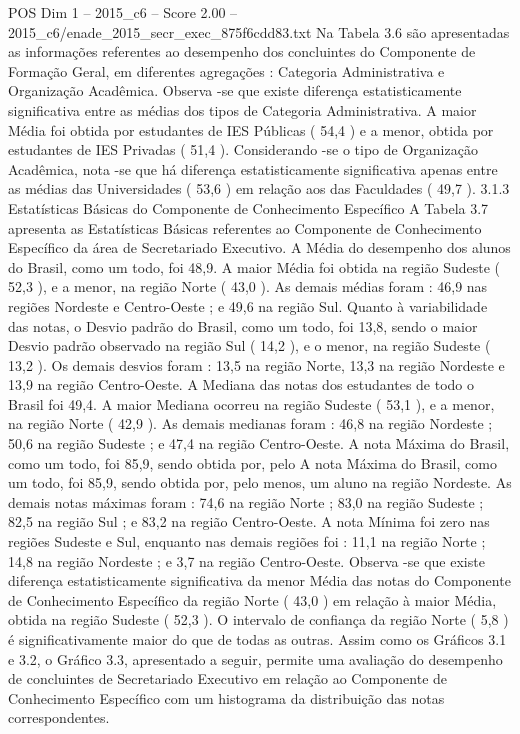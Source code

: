 \begin{textsample}{POS Dim 1 – 2015\_c6 – Score 2.00 – 2015\_c6/enade\_2015\_secr\_exec\_875f6cdd83.txt}
Na Tabela 3.6 são apresentadas as informações referentes ao desempenho dos concluintes do Componente de Formação Geral, em diferentes agregações : Categoria Administrativa e Organização Acadêmica.
Observa -se que existe diferença estatisticamente significativa entre as médias dos tipos de Categoria Administrativa.
A maior Média foi obtida por estudantes de IES Públicas ( 54,4 ) e a menor, obtida por estudantes de IES Privadas ( 51,4 ).
Considerando -se o tipo de Organização Acadêmica, nota -se que há diferença estatisticamente significativa apenas entre as médias das Universidades ( 53,6 ) em relação aos das Faculdades ( 49,7 ). 3.1.3 Estatísticas Básicas do Componente de Conhecimento Específico A Tabela 3.7 apresenta as Estatísticas Básicas referentes ao Componente de Conhecimento Específico da área de Secretariado Executivo.
A Média do desempenho dos alunos do Brasil, como um todo, foi 48,9.
A maior Média foi obtida na região Sudeste ( 52,3 ), e a menor, na região Norte ( 43,0 ).
As demais médias foram : 46,9 nas regiões Nordeste e Centro-Oeste ; e 49,6 na região Sul.
Quanto à variabilidade das notas, o Desvio padrão do Brasil, como um todo, foi 13,8, sendo o maior Desvio padrão observado na região Sul ( 14,2 ), e o menor, na região Sudeste ( 13,2 ).
Os demais desvios foram : 13,5 na região Norte, 13,3 na região Nordeste e 13,9 na região Centro-Oeste.
A Mediana das notas dos estudantes de todo o Brasil foi 49,4.
A maior Mediana ocorreu na região Sudeste ( 53,1 ), e a menor, na região Norte ( 42,9 ).
As demais medianas foram : 46,8 na região Nordeste ; 50,6 na região Sudeste ; e 47,4 na região Centro-Oeste.
A nota Máxima do Brasil, como um todo, foi 85,9, sendo obtida por, pelo A nota Máxima do Brasil, como um todo, foi 85,9, sendo obtida por, pelo menos, um aluno na região Nordeste.
As demais notas máximas foram : 74,6 na região Norte ; 83,0 na região Sudeste ; 82,5 na região Sul ; e 83,2 na região Centro-Oeste.
A nota Mínima foi zero nas regiões Sudeste e Sul, enquanto nas demais regiões foi : 11,1 na região Norte ; 14,8 na região Nordeste ; e 3,7 na região Centro-Oeste.
Observa -se que existe diferença estatisticamente significativa da menor Média das notas do Componente de Conhecimento Específico da região Norte ( 43,0 ) em relação à maior Média, obtida na região Sudeste ( 52,3 ).
O intervalo de confiança da região Norte ( 5,8 ) é significativamente maior do que de todas as outras.
Assim como os Gráficos 3.1 e 3.2, o Gráfico 3.3, apresentado a seguir, permite uma avaliação do desempenho de concluintes de Secretariado Executivo em relação ao Componente de Conhecimento Específico com um histograma da distribuição das notas correspondentes.

\end{textsample}
